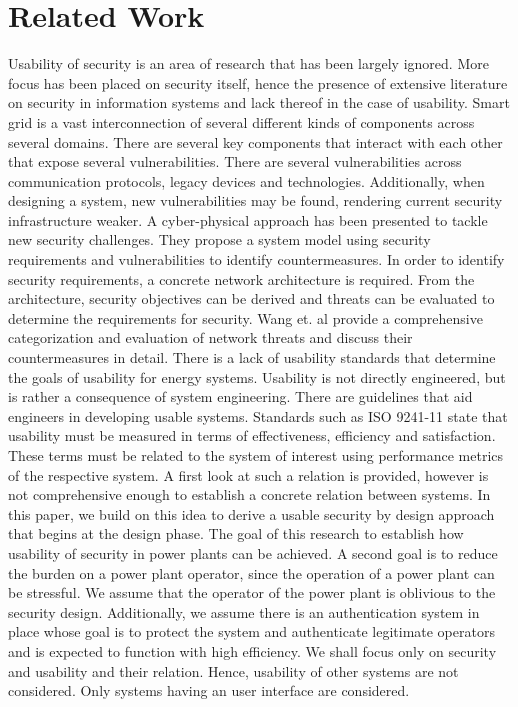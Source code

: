 \section{Related Work}
Usability of security is an area of research that has been largely ignored. More focus has been placed on security itself, hence the presence of extensive literature on security in information systems and lack thereof in the case of usability. Smart grid is a vast interconnection of several different kinds of components across several domains. There are several key components that interact with each other that expose several vulnerabilities\cite{liu2012cyber}. There are several vulnerabilities across communication protocols, legacy devices and technologies. Additionally, when designing a system, new vulnerabilities may be found, rendering current security infrastructure weaker. A cyber-physical approach\cite{mo2012cyber} has been presented to tackle new security challenges. They propose a system model using security requirements and vulnerabilities to identify countermeasures. In order to identify security requirements, a concrete network architecture is required. From the architecture, security objectives can be derived and threats can be evaluated to determine the requirements for security. Wang et. al\cite{wang2013cyber} provide a comprehensive categorization and evaluation of network threats and discuss their countermeasures in detail.
\newline 
There is a lack of usability standards that determine the goals of usability for energy systems. Usability is not directly engineered, but is rather a consequence of system engineering. There are guidelines that aid engineers in developing usable systems\cite{nurse2011guidelines}. Standards such as ISO 9241-11\cite{bevan2015iso} state that usability must be measured in terms of effectiveness, efficiency and satisfaction. These terms must be related to the system of interest using performance metrics of the respective system. A first look at such a relation is provided\cite{kainda2010security}, however is not comprehensive enough to establish a concrete relation between systems. In this paper, we build on this idea to derive a usable security by design approach that begins at the design phase\cite{nielsen1992usability}. The goal of this research to establish how usability of security in power plants can be achieved. A second goal is to reduce the burden on a power plant operator, since the operation of a power plant can be stressful. We assume that the operator of the power plant is oblivious to the security design. Additionally, we assume there is an authentication system in place whose goal is to protect the system and authenticate legitimate operators and is expected to function with high efficiency. We shall focus only on security and usability and their relation. Hence, usability of other systems are not considered. Only systems having an user interface are considered.

